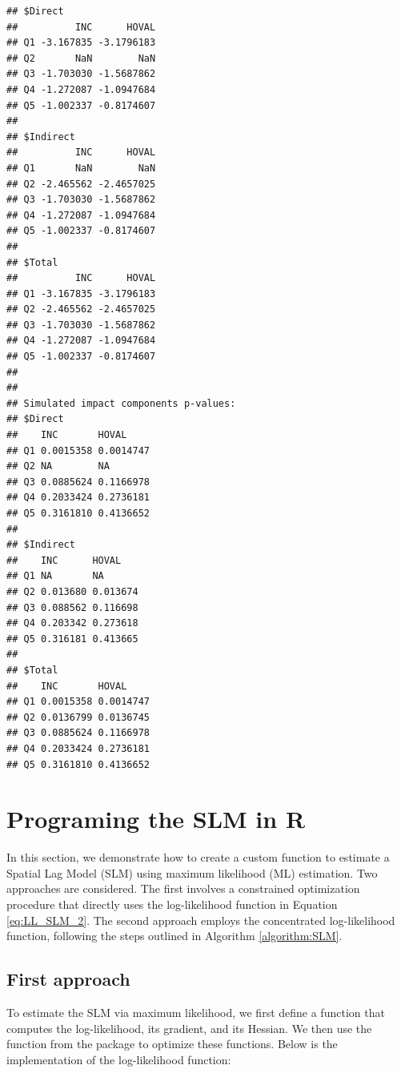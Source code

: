 \documentclass[english,12pt]{book}\usepackage[]{graphicx}\usepackage[]{xcolor}
\makeatletter
\newenvironment{kframe}{%
 \def\at@end@of@kframe{}%
 \ifinner\ifhmode%
  \def\at@end@of@kframe{\end{minipage}}%
  \begin{minipage}{\columnwidth}%
 \fi\fi%
 \def\FrameCommand##1{\hskip\@totalleftmargin \hskip-\fboxsep
 \colorbox{shadecolor}{##1}\hskip-\fboxsep
     \hskip-\linewidth \hskip-\@totalleftmargin \hskip\columnwidth}%
 \MakeFramed {\advance\hsize-\width
   \@totalleftmargin\z@ \linewidth\hsize
   \@setminipage}}%
 {\par\unskip\endMakeFramed%
 \at@end@of@kframe}
\newenvironment{knitrout}{}{} %
\makeatother
\begin{document}
\begin{knitrout}
\begin{kframe}
\begin{verbatim}
## $Direct
##          INC      HOVAL
## Q1 -3.167835 -3.1796183
## Q2       NaN        NaN
## Q3 -1.703030 -1.5687862
## Q4 -1.272087 -1.0947684
## Q5 -1.002337 -0.8174607
## 
## $Indirect
##          INC      HOVAL
## Q1       NaN        NaN
## Q2 -2.465562 -2.4657025
## Q3 -1.703030 -1.5687862
## Q4 -1.272087 -1.0947684
## Q5 -1.002337 -0.8174607
## 
## $Total
##          INC      HOVAL
## Q1 -3.167835 -3.1796183
## Q2 -2.465562 -2.4657025
## Q3 -1.703030 -1.5687862
## Q4 -1.272087 -1.0947684
## Q5 -1.002337 -0.8174607
## 
## 
## Simulated impact components p-values:
## $Direct
##    INC       HOVAL    
## Q1 0.0015358 0.0014747
## Q2 NA        NA       
## Q3 0.0885624 0.1166978
## Q4 0.2033424 0.2736181
## Q5 0.3161810 0.4136652
## 
## $Indirect
##    INC      HOVAL   
## Q1 NA       NA      
## Q2 0.013680 0.013674
## Q3 0.088562 0.116698
## Q4 0.203342 0.273618
## Q5 0.316181 0.413665
## 
## $Total
##    INC       HOVAL    
## Q1 0.0015358 0.0014747
## Q2 0.0136799 0.0136745
## Q3 0.0885624 0.1166978
## Q4 0.2033424 0.2736181
## Q5 0.3161810 0.4136652
\end{verbatim}
\end{kframe}
\end{knitrout}

\section{Programing the SLM in R}

In this section, we demonstrate how to create a custom function to estimate a Spatial Lag Model (SLM) using maximum likelihood (ML) estimation. Two approaches are considered. The first involves a constrained optimization procedure that directly uses the log-likelihood function in Equation \eqref{eq:LL_SLM_2}. The second approach employs the concentrated log-likelihood function, following the steps outlined in Algorithm \eqref{algorithm:SLM}.

\subsection{First approach}\label{sec:code-full-slm}

To estimate the SLM via maximum likelihood, we first define a function that computes the log-likelihood, its gradient, and its Hessian. We then use the  function from the  package \citep{henningsen2011maxlik} to optimize these functions. Below is the implementation of the log-likelihood function:
\end{document}
